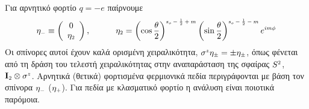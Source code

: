 Για αρνητικό φορτίο $q=-e$ παίρνουμε
\begin{equation}
    \eta\subscr{-}\equiv\left( \begin{array}{c} 0\\ \eta\subscr{2} \end{array} \right),\qquad\quad
    \eta\subscr{2}= \left(\cos\frac{\theta}{2}\right)\superscr{s\subscr{o}-\frac{1}{2}+m}\left(\sin\frac{\theta}{2}\right)\superscr{s\subscr{o}-\frac{1}{2}-m}e\superscr{im\phi}
\end{equation}
Οι σπίνορες αυτοί έχουν καλά ορισμένη χειραλικότητα, $\sigma\superscr{z}\eta\subscr{\pm}=\pm\eta\subscr{\pm}$, όπως φένεται από τη δράση του τελεστή χειραλικότητας 
στην αναπαράσταση της σφαίρας $S\superscr{2}$, $\mathbf{I\subscr{2}}\otimes\sigma\superscr{z}$. Αρνητικά (θετικά) φορτισμένα φερμιονικά πεδία περιγράφονται με βάση τον σπίνορα $\eta\subscr{-}$ ($\eta\subscr{+}$). 
Για πεδία με κλασματικό φορτίο η ανάλυση είναι ποιοτικά παρόμοια.\\

